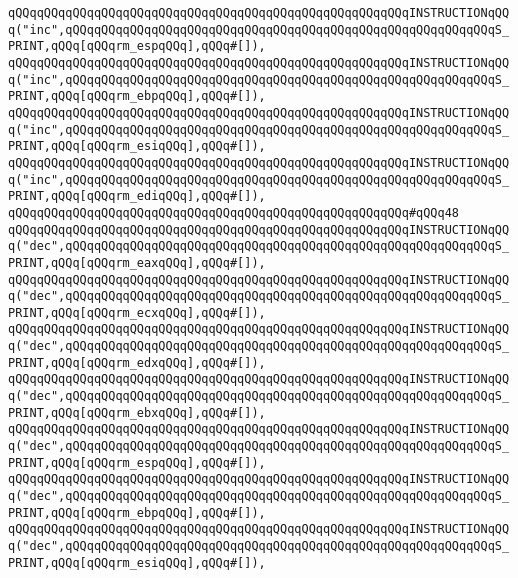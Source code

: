 \verb|qQQqqQQqqQQqqQQqqQQqqQQqqQQqqQQqqQQqqQQqqQQqqQQqqQQqqQQqINSTRUCTIONqQQq("inc",qQQqqQQqqQQqqQQqqQQqqQQqqQQqqQQqqQQqqQQqqQQqqQQqqQQqqQQqqQQqS_PRINT,qQQq[qQQqrm_espqQQq],qQQq#[]),|\newline
\verb|qQQqqQQqqQQqqQQqqQQqqQQqqQQqqQQqqQQqqQQqqQQqqQQqqQQqqQQqINSTRUCTIONqQQq("inc",qQQqqQQqqQQqqQQqqQQqqQQqqQQqqQQqqQQqqQQqqQQqqQQqqQQqqQQqqQQqS_PRINT,qQQq[qQQqrm_ebpqQQq],qQQq#[]),|\newline
\verb|qQQqqQQqqQQqqQQqqQQqqQQqqQQqqQQqqQQqqQQqqQQqqQQqqQQqqQQqINSTRUCTIONqQQq("inc",qQQqqQQqqQQqqQQqqQQqqQQqqQQqqQQqqQQqqQQqqQQqqQQqqQQqqQQqqQQqS_PRINT,qQQq[qQQqrm_esiqQQq],qQQq#[]),|\newline
\verb|qQQqqQQqqQQqqQQqqQQqqQQqqQQqqQQqqQQqqQQqqQQqqQQqqQQqqQQqINSTRUCTIONqQQq("inc",qQQqqQQqqQQqqQQqqQQqqQQqqQQqqQQqqQQqqQQqqQQqqQQqqQQqqQQqqQQqS_PRINT,qQQq[qQQqrm_ediqQQq],qQQq#[]),|\newline
\verb|qQQqqQQqqQQqqQQqqQQqqQQqqQQqqQQqqQQqqQQqqQQqqQQqqQQqqQQq#qQQq48|\newline
\verb|qQQqqQQqqQQqqQQqqQQqqQQqqQQqqQQqqQQqqQQqqQQqqQQqqQQqqQQqINSTRUCTIONqQQq("dec",qQQqqQQqqQQqqQQqqQQqqQQqqQQqqQQqqQQqqQQqqQQqqQQqqQQqqQQqqQQqS_PRINT,qQQq[qQQqrm_eaxqQQq],qQQq#[]),|\newline
\verb|qQQqqQQqqQQqqQQqqQQqqQQqqQQqqQQqqQQqqQQqqQQqqQQqqQQqqQQqINSTRUCTIONqQQq("dec",qQQqqQQqqQQqqQQqqQQqqQQqqQQqqQQqqQQqqQQqqQQqqQQqqQQqqQQqqQQqS_PRINT,qQQq[qQQqrm_ecxqQQq],qQQq#[]),|\newline
\verb|qQQqqQQqqQQqqQQqqQQqqQQqqQQqqQQqqQQqqQQqqQQqqQQqqQQqqQQqINSTRUCTIONqQQq("dec",qQQqqQQqqQQqqQQqqQQqqQQqqQQqqQQqqQQqqQQqqQQqqQQqqQQqqQQqqQQqS_PRINT,qQQq[qQQqrm_edxqQQq],qQQq#[]),|\newline
\verb|qQQqqQQqqQQqqQQqqQQqqQQqqQQqqQQqqQQqqQQqqQQqqQQqqQQqqQQqINSTRUCTIONqQQq("dec",qQQqqQQqqQQqqQQqqQQqqQQqqQQqqQQqqQQqqQQqqQQqqQQqqQQqqQQqqQQqS_PRINT,qQQq[qQQqrm_ebxqQQq],qQQq#[]),|\newline
\verb|qQQqqQQqqQQqqQQqqQQqqQQqqQQqqQQqqQQqqQQqqQQqqQQqqQQqqQQqINSTRUCTIONqQQq("dec",qQQqqQQqqQQqqQQqqQQqqQQqqQQqqQQqqQQqqQQqqQQqqQQqqQQqqQQqqQQqS_PRINT,qQQq[qQQqrm_espqQQq],qQQq#[]),|\newline
\verb|qQQqqQQqqQQqqQQqqQQqqQQqqQQqqQQqqQQqqQQqqQQqqQQqqQQqqQQqINSTRUCTIONqQQq("dec",qQQqqQQqqQQqqQQqqQQqqQQqqQQqqQQqqQQqqQQqqQQqqQQqqQQqqQQqqQQqS_PRINT,qQQq[qQQqrm_ebpqQQq],qQQq#[]),|\newline
\verb|qQQqqQQqqQQqqQQqqQQqqQQqqQQqqQQqqQQqqQQqqQQqqQQqqQQqqQQqINSTRUCTIONqQQq("dec",qQQqqQQqqQQqqQQqqQQqqQQqqQQqqQQqqQQqqQQqqQQqqQQqqQQqqQQqqQQqS_PRINT,qQQq[qQQqrm_esiqQQq],qQQq#[]),|\newline
